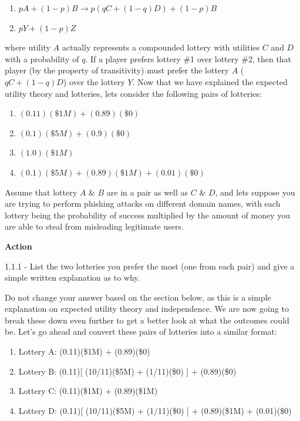 \documentclass[letterpaper,12pt]{report}
\begin{document}
\begin{enumerate}
    \item $pA + (1 - p)B  \rightarrow  p(qC + (1 - q)D) + (1 - p)B$
    \item $pY + (1 - p)Z$
\end{enumerate}

where utility $A$ actually represents a compounded lottery with utilities $C$ and $D$ with a probability of $q$. If a player prefers lottery \#1 over lottery \#2, then that player (by the property of transitivity) must prefer the lottery $A$ ($qC + (1 - q)D$) over the lottery $Y$. Now that we have explained the expected utility theory and lotteries, lets consider the following pairs of lotteries:

\begin{enumerate}
    \item[A.] $(0.11)(\$1M) + (0.89)(\$0)$
    \item[B.] $(0.1)(\$5M) + (0.9)(\$0)$
    \item[C.] $(1.0)(\$1M)$ 
    \item[D.] $(0.1)(\$5M) + (0.89)(\$1M) + (0.01)(\$0)$
\end{enumerate}

Assume that lottery $A$ \& $B$ are in a pair as well as $C$ \& $D$, and lets suppose you are trying to perform phishing attacks on different domain names, with each lottery being the probability of success multiplied by the amount of money you are able to steal from misleading legitimate users. 

\bigskip
\begin{mdframed}[backgroundcolor=blue!10,style=code,nobreak=true,align=center,userdefinedwidth=14cm]
    \textbf{Action}
    \bigskip
    
    1.1.1 - List the two lotteries you prefer the most (one from each pair) and give a simple written explanation as to why.
\end{mdframed}

Do not change your answer based on the section below, as this is a simple explanation on expected utility theory and independence. We are now going to break these down even further to get a better look at what the outcomes could be. Let’s go ahead and convert these pairs of lotteries into a similar format:

\begin{enumerate}
    \item Lottery A: (0.11)(\$1M) + (0.89)(\$0)
    \item Lottery B: (0.11)[ \small{(10/11)(\$5M) + (1/11)(\$0)}\normalsize{} ] + (0.89)(\$0)
    \item Lottery C: (0.11)(\$1M) + (0.89)(\$1M)
    \item Lottery D: (0.11)[ \small{(10/11)(\$5M) + (1/11)(\$0)}\normalsize{} ] + (0.89)(\$1M) + (0.01)(\$0)
\end{enumerate}
\end{document}
